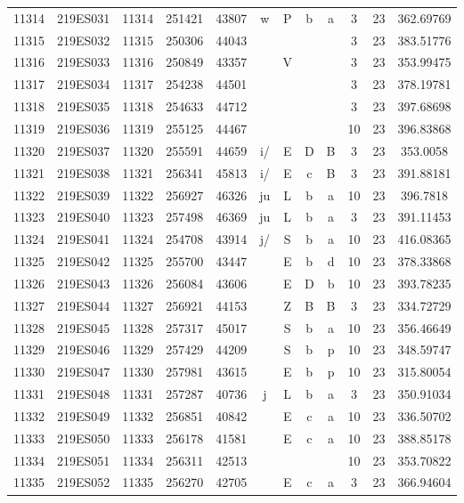 \begin{tabular}{|*{12}{c|}}
11314 & 219ES031 & 11314 & 251421 & 43807 & w & P & b & a & 3 & 23 & 362.69769 \\ 
11315 & 219ES032 & 11315 & 250306 & 44043 &  &  &  &  & 3 & 23 & 383.51776 \\ 
11316 & 219ES033 & 11316 & 250849 & 43357 &  & V &  &  & 3 & 23 & 353.99475 \\ 
11317 & 219ES034 & 11317 & 254238 & 44501 &  &  &  &  & 3 & 23 & 378.19781 \\ 
11318 & 219ES035 & 11318 & 254633 & 44712 &  &  &  &  & 3 & 23 & 397.68698 \\ 
11319 & 219ES036 & 11319 & 255125 & 44467 &  &  &  &  & 10 & 23 & 396.83868 \\ 
11320 & 219ES037 & 11320 & 255591 & 44659 & i/ & E & D & B & 3 & 23 & 353.0058 \\ 
11321 & 219ES038 & 11321 & 256341 & 45813 & i/ & E & c & B & 3 & 23 & 391.88181 \\ 
11322 & 219ES039 & 11322 & 256927 & 46326 & ju & L & b & a & 10 & 23 & 396.7818 \\ 
11323 & 219ES040 & 11323 & 257498 & 46369 & ju & L & b & a & 3 & 23 & 391.11453 \\ 
11324 & 219ES041 & 11324 & 254708 & 43914 & j/ & S & b & a & 10 & 23 & 416.08365 \\ 
11325 & 219ES042 & 11325 & 255700 & 43447 &  & E & b & d & 10 & 23 & 378.33868 \\ 
11326 & 219ES043 & 11326 & 256084 & 43606 &  & E & D & b & 10 & 23 & 393.78235 \\ 
11327 & 219ES044 & 11327 & 256921 & 44153 &  & Z & B & B & 3 & 23 & 334.72729 \\ 
11328 & 219ES045 & 11328 & 257317 & 45017 &  & S & b & a & 10 & 23 & 356.46649 \\ 
11329 & 219ES046 & 11329 & 257429 & 44209 &  & S & b & p & 10 & 23 & 348.59747 \\ 
11330 & 219ES047 & 11330 & 257981 & 43615 &  & E & b & p & 10 & 23 & 315.80054 \\ 
11331 & 219ES048 & 11331 & 257287 & 40736 & j & L & b & a & 3 & 23 & 350.91034 \\ 
11332 & 219ES049 & 11332 & 256851 & 40842 &  & E & c & a & 10 & 23 & 336.50702 \\ 
11333 & 219ES050 & 11333 & 256178 & 41581 &  & E & c & a & 10 & 23 & 388.85178 \\ 
11334 & 219ES051 & 11334 & 256311 & 42513 &  &  &  &  & 10 & 23 & 353.70822 \\ 
11335 & 219ES052 & 11335 & 256270 & 42705 &  & E & c & a & 3 & 23 & 366.94604 \\ 

\end{tabular}
